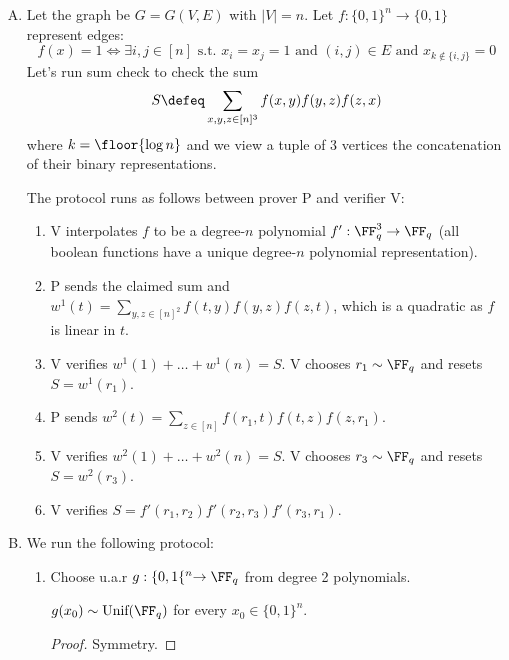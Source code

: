 \documentclass{scrartcl}
\begin{document}
\begin{sol}
    \begin{enumerate}[A.]
        \item 
        Let the graph be $G=G(V, E)$ with $|V|=n$.
        Let $f: \{0, 1\}^n \rightarrow \{0,1\}$ represent edges:
        \[f(x) = 1 \iff \exists i, j \in [n] \text{ s.t. } x_i = x_j = 1 \text{ and } (i, j) \in E \text{ and } x_{k\not \in \{i,j\}}=0\]
        Let's run sum check to check the sum
        \[S \defeq \sum_{x, y, z \in [n]^3} f(x, y) f(y, z) f(z, x)\]
        where $k = \floor{\log{n}}$ and we view a tuple of 3 vertices the concatenation of their binary representations.

        The protocol runs as follows between prover P and verifier V:
        \begin{enumerate}
            \item 
            V interpolates $f$ to be a degree-$n$ polynomial $f': \FF_q^3 \rightarrow \FF_q$ (all boolean functions have a unique degree-$n$ polynomial representation).
            \item 
            P sends the claimed sum and $w^1(t) = \sum_{y, z \in [n]^2} f(t, y) f(y, z) f(z, t)$, which is a quadratic as $f$ is linear in $t$.
            \item 
            V verifies $w^1(1) + \ldots + w^1(n) = S$. V chooses $r_1 \sim \FF_q$ and resets $S=w^1(r_1)$.
            \item
            P sends $w^2(t) = \sum_{z \in [n]} f(r_1, t) f(t, z) f(z, r_1)$.
            \item 
            V verifies $w^2(1) + \ldots + w^2(n) = S$. V chooses $r_3 \sim \FF_q$ and resets $S=w^2(r_3)$.
            \item
            V verifies $S = f'(r_1, r_2)f'(r_2, r_3) f'(r_3, r_1)$. 
        \end{enumerate}

        \item 
        We run the following protocol:
        \begin{enumerate}
            \item 
            Choose u.a.r $g: \{0, 1\{^n \rightarrow \FF_q$ from degree 2 polynomials.
            
            \begin{fact}
                $g(x_0) \sim \text{Unif}(\FF_q)$ for every $x_0 \in \{0, 1\}^n$. 
            \end{fact}
            \begin{proof}
                Symmetry.
            \end{proof}


\end{enumerate}
\end{enumerate}
\end{sol}
\end{document}
